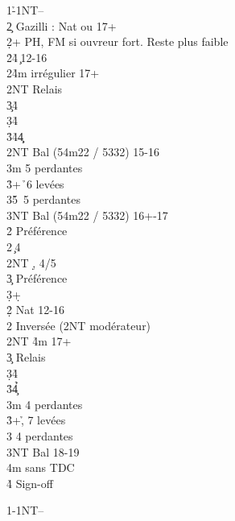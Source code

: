 \documentclass[a4paper]{article}
\begin{document}
\begin{bidtable}
1\h-1NT--\\
2\c \> Gazilli : Nat ou 17+\+\\
2\d {}+ PH, FM si ouvreur fort. Reste plus faible\+\\
2\h {}\h 4\c\ 12-16\\
2\s {}\h 4m irrégulier 17+\+\\
2NT \> Relais\+\\
3\c {}\h 4\c \\
3\d {}\h 4\d \\
3\h {}\h 4\d 4\c \-\-\\
2NT \> Bal (54m22 / 5332) 15-16\\
3m  5 perdantes\\
3\h {}+\h\ 6 levées\\
3\s {}\h 5\s\ 5 perdantes\\
3NT \> Bal (54m22 / 5332) 16+-17\-\\
2\h \> Préférence\\
2\s {}\c\ 4\d \\
2NT \d , 4/5\c \\
3\c \> Préférence\\
3\d {}+\d \-\\
2\d\h \> Nat 12-16\\
2\s \> Inversée (2NT modérateur)\\
2NT \h 4m 17+\+\\
3\c \> Relais\+\\
3\d {}\h 4\d \\
3\h {}\h 4\c \-\-\\
3m  4 perdantes\\
3\h {}+\h , 7 levées\\
3\s {} 4 perdantes\\
3NT \> Bal 18-19\\
4m  sans TDC\\
4\h \> Sign-off
\end{bidtable}

\begin{bidtable}
1\s-1NT--
\end{bidtable}
\end{document}
